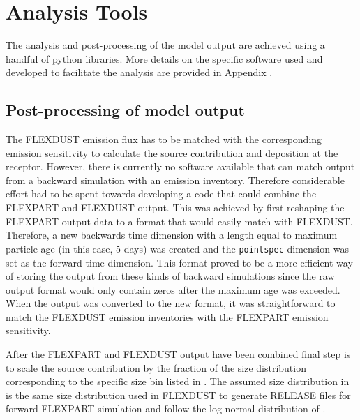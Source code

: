 \section{Analysis Tools}

The analysis and post-processing of the model output are achieved using a handful of python libraries. More details on the specific software used and developed to facilitate the analysis are provided in Appendix .
\subsection{Post-processing of model output}
The FLEXDUST emission flux has to be matched with the corresponding emission sensitivity to calculate the source contribution and deposition at the receptor. 
However, there is currently no software available that can match output from a backward simulation with an emission inventory. 
Therefore considerable effort had to be spent towards developing a code that could combine the FLEXPART and FLEXDUST output.   
This was achieved by first reshaping the FLEXPART output data to a format that would easily match with FLEXDUST. 
Therefore, a new backwards time dimension with a length equal to maximum particle age (in this case, 5 days) was created and the 
 \verb|pointspec| dimension was set as the forward time dimension. 
This format proved to be a more efficient way of storing the output from these kinds of backward simulations since the raw output format would only contain zeros after the maximum age was exceeded. When the output was converted to the new format, it was straightforward to match the FLEXDUST emission inventories with the FLEXPART emission sensitivity. 

 After the FLEXPART and FLEXDUST output have been combined final step is to scale the source contribution by the fraction of the size distribution corresponding to the specific size bin listed in . The assumed size distribution in  is the same size distribution used in FLEXDUST to generate RELEASE files for forward FLEXPART simulation and follow the log-normal distribution of .  



